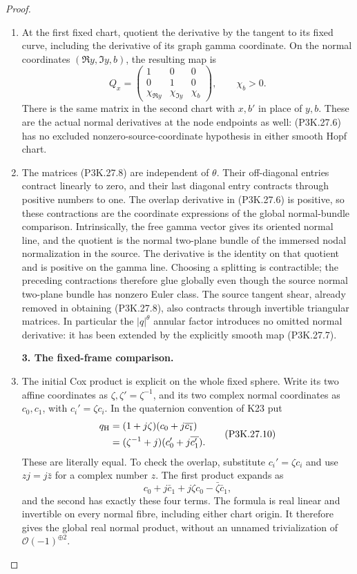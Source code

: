 \begin{proof}
\begin{enumerate}[label=\arabic*.]
\item At the first fixed chart, quotient the derivative by the
tangent to its fixed curve, including the derivative of
its graph gamma coordinate. On the normal coordinates
\((\Re y,\Im y,b)\), the resulting map is
\[
 Q_x=
 \begin{pmatrix}
 1&0&0\\
 0&1&0\\
 \chi_{\Re y}&\chi_{\Im y}&\chi_b
 \end{pmatrix},\qquad \chi_b>0.                         \tag{P3K.27.8}
\]
There is the same matrix in the second chart with \(x,b'\)
in place of \(y,b\). These are the actual normal derivatives
at the node endpoints as well: (P3K.27.6) has no excluded
nonzero-source-coordinate hypothesis in either smooth
Hopf chart.

\item The matrices (P3K.27.8) are independent of \(\theta\).
Their off-diagonal entries contract linearly to zero,
and their last diagonal entry contracts through positive
numbers to one. The overlap derivative in (P3K.27.6) is
positive, so these contractions are the coordinate
expressions of the global normal-bundle comparison.
Intrinsically, the free gamma vector gives its oriented
normal line, and the quotient is the normal two-plane
bundle of the immersed nodal normalization in the source.
The derivative is the identity on that quotient and is
positive on the gamma line. Choosing a splitting is
contractible; the preceding contractions therefore glue
globally even though the source normal two-plane bundle
has nonzero Euler class.
The source tangent shear, already removed in obtaining
(P3K.27.8), also contracts through invertible triangular
matrices. In particular the \(|q|^\theta\) annular factor
introduces no omitted normal derivative: it has been
extended by the explicitly smooth map (P3K.27.7).

\par\medskip\noindent\textbf{3. The fixed-frame comparison.}\enspace

\item The initial Cox product is explicit on the whole fixed
sphere. Write its two affine coordinates as
\(\zeta,\zeta'=\zeta^{-1}\), and its two complex normal
coordinates as \(c_0,c_1\), with
\(c_i'=\zeta c_i\). In the quaternion convention of K23 put
\[
\begin{aligned}
 q_{\rm H}
   &=(1+j\zeta)(c_0+j\overline{c_1})\\
   &=(\zeta^{-1}+j)(c_0'+j\overline{c_1'}).
\end{aligned}                                          \tag{P3K.27.10}
\]
These are literally equal. To check the overlap, substitute
\(c_i'=\zeta c_i\) and use
\(zj=j\bar z\) for a complex number \(z\).
The first product expands as
\[
       c_0+j\bar c_1+j\zeta c_0-\bar\zeta\bar c_1,
\]
and the second has exactly these four terms.
The formula is real linear and invertible on every normal
fibre, including either chart origin. It therefore gives
the global real normal product, without an unnamed
trivialization of \(\mathcal O(-1)^{\oplus2}\).


\end{enumerate}
\end{proof}
